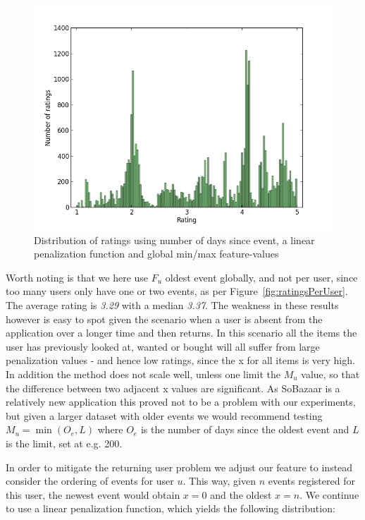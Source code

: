 \begin{figure}[H]
  \centering
  \includegraphics[scale=0.6]{image/dist-recentness-linear-global}
 \caption{Distribution of ratings using number of days since event, a linear
 penalization function and global min/max feature-values}
  \label{fig:dist-recentness-linear-global}
\end{figure}

Worth noting is that we here use $F_u$ oldest event globally, and not per user,
since too many users only have one or two events, as per
Figure~\ref{fig:ratingsPerUser}. The average rating is \textit{3.29} with a
median \textit{3.37}. The weakness in these results however is easy to spot
given the scenario when a user is absent from the application over a longer
time and then returns. In this scenario all the items the user has previously
looked at, wanted or bought will all suffer from large penalization values -
and hence low ratings, since the x for all items is very high. In addition the
method does not scale well, unless one limit the $M_u$ value, so that the
difference between two adjacent x values are significant. As SoBazaar is a
relatively new application this proved not to be a problem with our
experiments, but given a larger dataset with older events we would recommend
testing $M_u = \min(O_e, L)$ where $O_e$ is the number of days since the oldest
event and $L$ is the limit, set at e.g. 200.

In order to mitigate the returning user problem we adjust our feature to
instead consider the ordering of events for user $u$. This way, given $n$
events registered for this user, the newest event would obtain $x=0$ and the
oldest $x=n$. We continue to use a linear penalization function, which yields
the following distribution:

